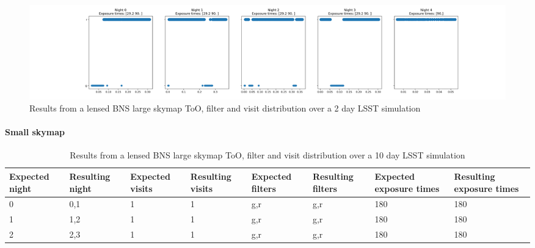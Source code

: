 \begin{figure}
    \centering
    \includegraphics[width=\linewidth]{figures/validationTests/SVRequired/LensedBNSAFilterPlot.png}
    \caption{Results from a lensed BNS large skymap ToO, filter and visit distribution over a 2 day LSST simulation}
    \label{fig:LensedBNSAFilterResult}
\end{figure}
\newpage

\paragraph{Small skymap}

\begin{table}[]
\centering
\begin{adjustbox}{max width=\linewidth}
\begin{tabular}{|l|l|l|l|l|l|l|l|}
\hline
Expected night & Resulting night & Expected visits & Resulting visits & Expected filters & Resulting filters & Expected exposure times & Resulting exposure times \\ \hline
0              & 0,1             & 1               & 1                & g,r              & g,r               & 180                     & 180                      \\ \hline
1              & 1,2             & 1               & 1                & g,r              & g,r               & 180                     & 180                      \\ \hline
2              & 2,3             & 1               & 1                & g,r              & g,r               & 180                     & 180                      \\ \hline
\end{tabular}
\end{adjustbox}
\caption{Results from a lensed BNS large skymap ToO, filter and visit distribution over a 10 day LSST simulation}
\label{tab:LensedBNSBResults}
\end{table}


